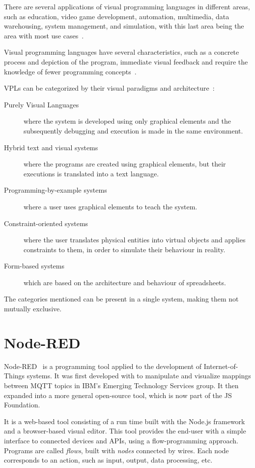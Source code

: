 There are several applications of visual programming languages in different areas, such as education, video game development, automation, multimedia, data warehousing, system management, and simulation, with this last area being the area with most use cases~\cite{survey_vpl_iot}.

Visual programming languages have several characteristics, such as a concrete process and depiction of the program, immediate visual feedback and require the knowledge of fewer programming concepts~\cite{scaling_vpls}.

VPLs can be categorized by their visual paradigms and architecture~\cite{vpls_survey}: 
\begin{description}
    \item[Purely Visual Languages] where the system is developed using only graphical elements and the subsequently debugging and execution is made in the same environment.
    \item[Hybrid text and visual systems] where the programs are created using graphical elements, but their executions is translated into a text language.
    \item[Programming-by-example systems] where a user uses graphical elements to teach the system.
    \item[Constraint-oriented systems] where the user translates physical entities into virtual objects and applies constraints to them, in order to simulate their behaviour in reality.
    \item[Form-based systems] which are based on the architecture and behaviour of spreadsheets.
\end{description}

The categories mentioned can be present in a single system, making them not mutually exclusive.

\section{Node-RED}\label{sec:node-red}

Node-RED~\cite{node_red} is a programming tool applied to the development of Internet-of-Things systems. It was first developed with to manipulate and visualize mappings between MQTT topics in IBM's Emerging Technology Services group. It then expanded into a more general open-source tool, which is now part of the JS Foundation.

It is a web-based tool consisting of a run time built with the Node.js framework and a browser-based visual editor. This tool provides the end-user with a simple interface to connected devices and APIs, using a flow-programming approach. Programs are called \emph{flows}, built with \emph{nodes} connected by wires. Each node corresponds to an action, such as input, output, data processing, etc.


